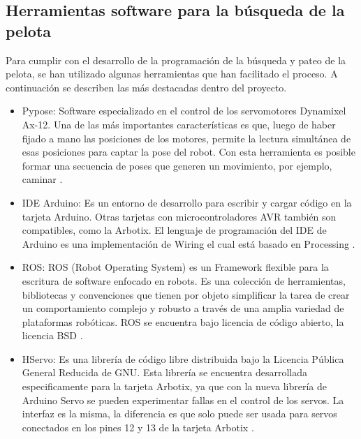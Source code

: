 \subsection{Herramientas software para la b\'usqueda de la pelota } \label{subsection:Herrbusqueda}

Para cumplir con el desarrollo de la programación de la búsqueda y pateo de la pelota, se han utilizado algunas herramientas que han facilitado el proceso. A continuación se describen las más destacadas dentro del proyecto. 

\begin{itemize}
\item Pypose: Software especializado en el control de los servomotores Dynamixel Ax-12. Una de las más importantes características es que, luego de haber fijado a mano las posiciones de los motores, permite la lectura simultánea de esas posiciones para captar la pose del robot. Con esta herramienta es posible formar una secuencia de poses que generen un movimiento, por ejemplo, caminar \cite{pypose}. 

\item IDE Arduino: Es un entorno de desarrollo para escribir y cargar código en la tarjeta Arduino. Otras tarjetas con microcontroladores AVR también son compatibles, como la Arbotix. El lenguaje de programación del IDE de Arduino es una implementación de Wiring el cual está basado en Processing \cite{arduino}.  


\item ROS: ROS (Robot Operating System) es un Framework flexible para la escritura de software enfocado en robots. Es una colección de herramientas, bibliotecas y convenciones que tienen por objeto simplificar la tarea de crear un comportamiento complejo y robusto a través de una amplia variedad de plataformas robóticas. ROS se encuentra bajo licencia de código abierto, la licencia BSD \cite{ros}.

\item HServo: Es una librería de código libre distribuida bajo la Licencia Pública General Reducida de GNU. Esta librería se encuentra desarrollada especificamente para la tarjeta Arbotix, ya que con la nueva librería de Arduino Servo se pueden experimentar fallas en el control de los servos. La interfaz es la misma, la diferencia es que solo puede ser usada para servos conectados en los pines 12 y 13 de la tarjeta Arbotix \cite{HServo}.    

\end{itemize}

